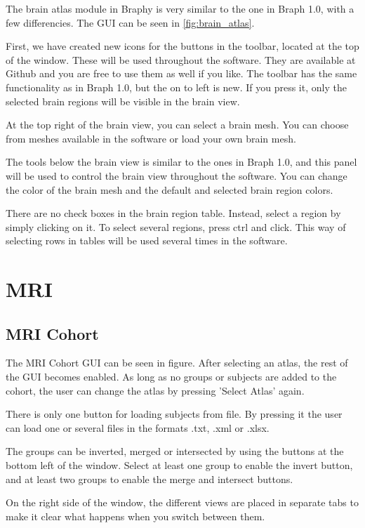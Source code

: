 \documentclass{article}
\begin{document}
The brain atlas module in Braphy is very similar to the one in Braph 1.0, with a few differencies. The GUI can be seen in \cref{fig:brain_atlas}.

First, we have created new icons for the buttons in the toolbar, located at the top of the window. These will be used throughout the software. They are available at Github and you are free to use them as well if you like. The toolbar has the same functionality as in Braph 1.0, but the on to left is new. If you press it, only the selected brain regions will be visible in the brain view.

At the top right of the brain view, you can select a brain mesh. You can choose from meshes available in the software or load your own brain mesh.

The tools below the brain view is similar to the ones in Braph 1.0, and this panel will be used to control the brain view throughout the software. You can change the color of the brain mesh and the default and selected brain region colors.

There are no check boxes in the brain region table. Instead, select a region by simply clicking on it. To select several regions, press ctrl and click. This way of selecting rows in tables will be used several times in the software.

\section{MRI}

\subsection{MRI Cohort}

The MRI Cohort GUI can be seen in figure. After selecting an atlas, the rest of the GUI becomes enabled. As long as no groups or subjects are added to the cohort, the user can change the atlas by pressing 'Select Atlas' again.

There is only one button for loading subjects from file. By pressing it the user can load one or several files in the formats .txt, .xml or .xlsx.

The groups can be inverted, merged or intersected by using the buttons at the bottom left of the window. Select at least one group to enable the invert button, and at least two groups to enable the merge and intersect buttons. 

On the right side of the window, the different views are placed in separate tabs to make it clear what happens when you switch between them.
\end{document}
